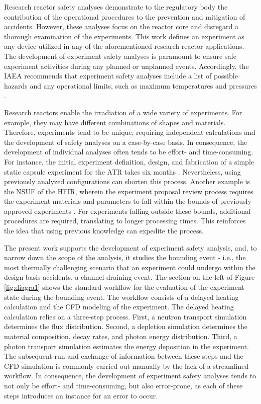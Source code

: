 Research reactor safety analyses demonstrate to the regulatory body the contribution of the operational procedures to the prevention and mitigation of accidents.
However, these analyses focus on the reactor core and disregard a thorough examination of the experiments.
This work defines an experiment as any device utilized in any of the aforementioned research reactor applications.
The development of experiment safety analyses is paramount to ensure safe experiment activities during any planned or unplanned events.
Accordingly, the \gls*{IAEA} recommends that experiment safety analyses include a list of possible hazards and any operational limits, such as maximum temperatures and pressures \cite{noauthor_safety_2012}.

Research reactors enable the irradiation of a wide variety of experiments.
For example, they may have different combinations of shapes and materials.
Therefore, experiments tend to be unique, requiring independent calculations and the development of safety analyses on a case-by-case basis.
In consequence, the development of individual analyses often tends to be effort- and time-consuming.
For instance, the initial experiment definition, design, and fabrication of a simple static capsule experiment for the \gls*{ATR} takes six months \cite{inl_advanced_2009}.
Nevertheless, using previously analyzed configurations can shorten this process.
%
Another example is the \gls*{NSUF} of the \gls*{HFIR}, wherein the experiment proposal review process requires the experiment materials and parameters to fall within the bounds of previously approved experiments \cite{hfir}.
For experiments falling outside these bounds, additional procedures are required, translating to longer processing times.
This reinforces the idea that using previous knowledge can expedite the process.

The present work supports the development of experiment safety analysis, and, to narrow down the scope of the analysis, it studies the bounding event - i.e., the most thermally challenging scenario that an experiment could undergo within the design basis accidents, a channel draining event.
The section on the left of Figure \ref{fig:diagra1} shows the standard workflow for the evaluation of the experiment state during the bounding event.
The workflow consists of a delayed heating calculation and the \gls*{CFD} modeling of the experiment.
The delayed heating calculation relies on a three-step process.
First, a neutron transport simulation determines the flux distribution.
Second, a depletion simulation determines the material composition, decay rates, and photon energy distribution.
Third, a photon transport simulation estimates the energy deposition in the experiment.
The subsequent run and exchange of information between these steps and the CFD simulation is commonly carried out manually by the lack of a streamlined workflow.
In consequence, the development of experiment safety analyses tends to not only be effort- and time-consuming, but also error-prone, as each of these steps introduces an instance for an error to occur.

